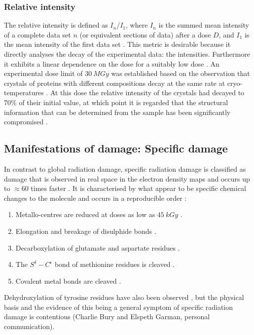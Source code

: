         \subsubsection{Relative intensity}
        \label{subs:Relative intensity}
            The relative intensity is defined as $I_n/I_1$, where $I_n$ is the summed mean intensity of a complete data set $n$ (or equivalent sections of data) after a dose $D$, and $I_1$ is the mean intensity of the first data set \cite{garman2010}.
            This metric is desirable because it directly analyses the decay of the experimental data: the intensities. Furthermore it exhibits a linear dependence on the dose for a suitably low dose \cite{owen2006,zeldin2013dwd}.
            An experimental dose limit of $30\ MGy$ was established based on the observation that crystals of proteins with different compositions decay at the same rate at cryo-temperatures \cite{owen2006}.
            At this dose the relative intensity of the crystals had decayed to 70\% of their initial value, at which point it is regarded that the structural information that can be determined from the sample has been significantly compromised \cite{owen2006,blundell1976protein}.

    \subsection{Manifestations of damage: Specific damage}
    \label{sub:Manifestations of damage: Specific damage}
        In contrast to global radiation damage, specific radiation damage is classified as damage that is observed in real space in the electron density maps and occurs up to $\approx 60$ times faster \cite{holton2009}.
        It is characterised by what appear to be specific chemical changes to the molecule and occurs in a reproducible order \cite{ravelli2000,weik2000,gerstel2015identifying}:
        \begin{enumerate}
            \item Metallo-centres are reduced at doses as low as $45\ kGy$ \cite{owen2011revealing}.
            \item Elongation and breakage of disulphide bonds \cite{burmeister2000structural,ravelli2000}.
            \item Decarboxylation of glutamate and aspartate residues \cite{burmeister2000structural,weik2000,ravelli2000}.
            \item The $S^{\delta}-C^{\epsilon}$ bond of methionine residues is cleaved \cite{burmeister2000structural}.
            \item Covalent metal bonds are cleaved \cite{ramagopal2005radiation}.
        \end{enumerate}
        Dehydroxylation of tyrosine residues have also been observed \cite{burmeister2000structural}, but the physical basis and the evidence of this being a general symptom of specific radiation damage is contentious (Charlie Bury and Elspeth Garman, personal communication).


